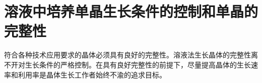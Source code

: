 ﻿\setcounter{section}{3}
\section{溶液中培养单晶生长条件的控制和单晶的完整性}
符合各种技术应用要求的晶体必须具有良好的完整性。溶液法生长晶体的完整性离不开对生长条件的严格控制。在具有良好完整性的前提下，尽量提高晶体的生长速率和利用率是晶体生长工作者始终不渝的追求目标。


